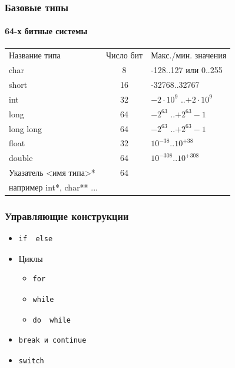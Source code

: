 \documentclass[12pt,pdf,hyperref={unicode}]{beamer}
\begin{document}
\begin{frame}
\frametitle{Базовые типы}
\framesubtitle{64-х битные системы}
\begin{center}
\begin{tabular}{ l c l }
  Название типа & Число бит & Макс./мин. значения \\
  char & 8 & -128..127 или 0..255 \\
  short & 16 & -32768..32767 \\
  int & 32 & $-2 \cdot 10^9$ ..$+2 \cdot 10^9$ \\
  long & 64& $-2^{63}$ ..$+2^{63}-1$ \\
  long long & 64 & $-2^{63}$ ..$+2^{63}-1$ \\
  float & 32 & $10^{-38}$..$10^{+38}$ \\
  double & 64 & $10^{-308}$..$10^{+308}$ \\
  Указатель <имя типа>* & 64 & \\
  например int*, char** ... & &
\end{tabular}
\end{center}
\end{frame}


\begin{frame}[fragile]
\frametitle{Управляющие конструкции} 
\begin{itemize}
\item 
\begin{verbatim}
if  else
\end{verbatim}
\item Циклы
\begin{itemize}
\item 
\begin{verbatim}
for
\end{verbatim}
\item 
\begin{verbatim}
while
\end{verbatim}
\item 
\begin{verbatim}
do  while
\end{verbatim}
\end{itemize}
\item  
\begin{verbatim}
break и continue
\end{verbatim}
\item  
\begin{verbatim}
switch
\end{verbatim}
\end{itemize}
\end{frame}
\end{document}

